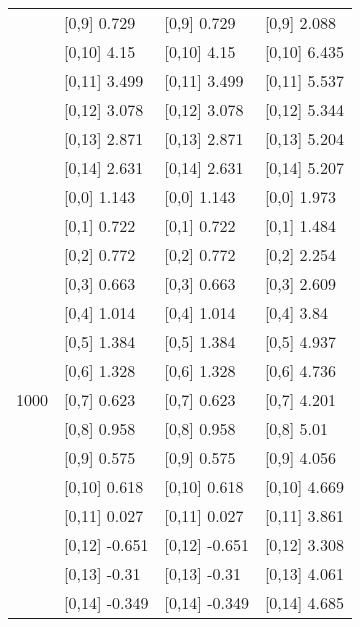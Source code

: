 \begin{table}
\begin{tabular}[t]{llll}
 & {}[0,9] 0.729 & {}[0,9] 0.729 & {}[0,9] 2.088\\
\addlinespace
 & {}[0,10] 4.15 & {}[0,10] 4.15 & {}[0,10] 6.435\\
 & {}[0,11] 3.499 & {}[0,11] 3.499 & {}[0,11] 5.537\\
 & {}[0,12] 3.078 & {}[0,12] 3.078 & {}[0,12] 5.344\\
 & {}[0,13] 2.871 & {}[0,13] 2.871 & {}[0,13] 5.204\\
 & {}[0,14] 2.631 & {}[0,14] 2.631 & {}[0,14] 5.207\\
\addlinespace
 & {}[0,0] 1.143 & {}[0,0] 1.143 & {}[0,0] 1.973\\
 & {}[0,1] 0.722 & {}[0,1] 0.722 & {}[0,1] 1.484\\
 & {}[0,2] 0.772 & {}[0,2] 0.772 & {}[0,2] 2.254\\
 & {}[0,3] 0.663 & {}[0,3] 0.663 & {}[0,3] 2.609\\
 & {}[0,4] 1.014 & {}[0,4] 1.014 & {}[0,4] 3.84\\
\addlinespace
 & {}[0,5] 1.384 & {}[0,5] 1.384 & {}[0,5] 4.937\\
 & {}[0,6] 1.328 & {}[0,6] 1.328 & {}[0,6] 4.736\\
1000 & {}[0,7] 0.623 & {}[0,7] 0.623 & {}[0,7] 4.201\\
 & {}[0,8] 0.958 & {}[0,8] 0.958 & {}[0,8] 5.01\\
 & {}[0,9] 0.575 & {}[0,9] 0.575 & {}[0,9] 4.056\\
\addlinespace
 & {}[0,10] 0.618 & {}[0,10] 0.618 & {}[0,10] 4.669\\
 & {}[0,11] 0.027 & {}[0,11] 0.027 & {}[0,11] 3.861\\
 & {}[0,12] -0.651 & {}[0,12] -0.651 & {}[0,12] 3.308\\
 & {}[0,13] -0.31 & {}[0,13] -0.31 & {}[0,13] 4.061\\
 & {}[0,14] -0.349 & {}[0,14] -0.349 & {}[0,14] 4.685\\
\bottomrule
\end{tabular}
\end{table}

